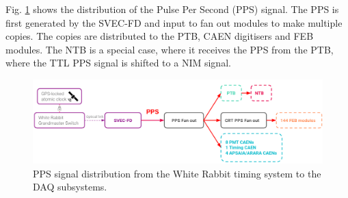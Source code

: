 Fig. \ref{fig:pps_dist} shows the distribution of the Pulse Per Second (PPS) signal.
The PPS is first generated by the SVEC-FD and input to fan out modules to make multiple copies.
The copies are distributed to the PTB, CAEN digitisers and FEB modules.
The NTB is a special case, where it receives the PPS from the PTB, where the TTL PPS signal is shifted to a NIM signal.

\begin{figure}[hb!] 
\centering    
\includegraphics[width=1.0\textwidth]{pps_dist}
\caption[PPS Signal Distribution]{
PPS signal distribution from the White Rabbit timing system to the DAQ subsystems. 
}
\label{fig:pps_dist}
\end{figure}
